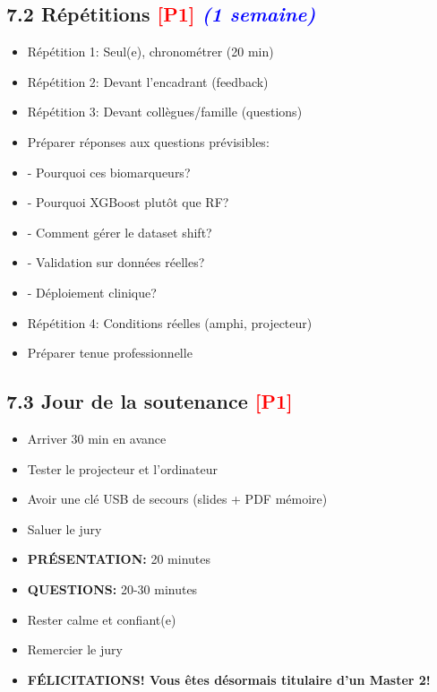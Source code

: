 \documentclass[a4paper,11pt]{article}
\newcommand{\checkbox}{\large$\square$}
\newcommand{\priorite}[1]{\textcolor{red}{\textbf{[#1]}}}
\newcommand{\duree}[1]{\textcolor{blue}{\textit{(#1)}}}
\begin{document}
\subsection*{7.2 Répétitions \priorite{P1} \duree{1 semaine}}

\begin{itemize}[label=\checkbox]
    \item Répétition 1: Seul(e), chronométrer (20 min)
    \item Répétition 2: Devant l'encadrant (feedback)
    \item Répétition 3: Devant collègues/famille (questions)
    \item Préparer réponses aux questions prévisibles:
    \item \quad - Pourquoi ces biomarqueurs?
    \item \quad - Pourquoi XGBoost plutôt que RF?
    \item \quad - Comment gérer le dataset shift?
    \item \quad - Validation sur données réelles?
    \item \quad - Déploiement clinique?
    \item Répétition 4: Conditions réelles (amphi, projecteur)
    \item Préparer tenue professionnelle
\end{itemize}

\subsection*{7.3 Jour de la soutenance \priorite{P1}}

\begin{itemize}[label=\checkbox]
    \item Arriver 30 min en avance
    \item Tester le projecteur et l'ordinateur
    \item Avoir une clé USB de secours (slides + PDF mémoire)
    \item Saluer le jury
    \item \textbf{PRÉSENTATION:} 20 minutes
    \item \textbf{QUESTIONS:} 20-30 minutes
    \item Rester calme et confiant(e)
    \item Remercier le jury
    \item \textbf{FÉLICITATIONS! Vous êtes désormais titulaire d'un Master 2!}
\end{itemize}
\end{document}
